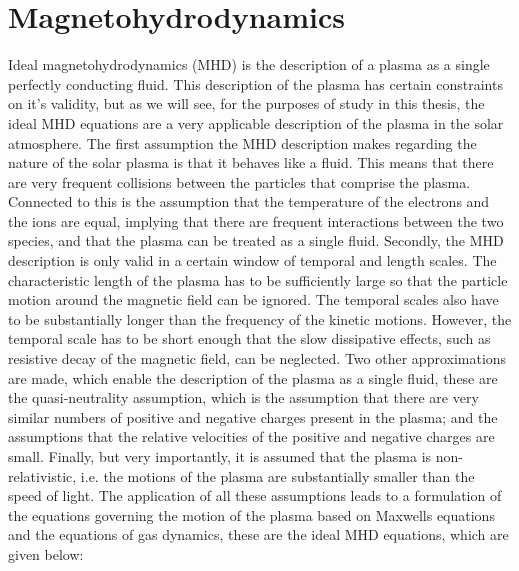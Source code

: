 \section{Magnetohydrodynamics}\label{sec:MHD}

Ideal magnetohydrodynamics (MHD) is the description of a plasma as a single perfectly conducting fluid.
This description of the plasma has certain constraints on it's validity, but as we will see, for the purposes of study in this thesis, the ideal MHD equations are a very applicable description of the plasma in the solar atmosphere.
The first assumption the MHD description makes regarding the nature of the solar plasma is that it behaves like a fluid.
This means that there are very frequent collisions between the particles that comprise the plasma.
Connected to this is the assumption that the temperature of the electrons and the ions are equal, implying that there are frequent interactions between the two species, and that the plasma can be treated as a single fluid.
Secondly, the MHD description is only valid in a certain window of temporal and length scales.
The characteristic length of the plasma has to be sufficiently large so that the particle motion around the magnetic field can be ignored.
The temporal scales also have to be substantially longer than the frequency of the kinetic motions.
However, the temporal scale has to be short enough that the slow dissipative effects, such as resistive decay of the magnetic field, can be neglected.
Two other approximations are made, which enable the description of the plasma as a single fluid, these are the quasi-neutrality assumption, which is the assumption that there are very similar numbers of positive and negative charges present in the plasma; and the assumptions that the relative velocities of the positive and negative charges are small.
Finally, but very importantly, it is assumed that the plasma is non-relativistic, i.e. the motions of the plasma are substantially smaller than the speed of light.
The application of all these assumptions leads to a formulation of the equations governing the motion of the plasma based on Maxwells equations and the equations of gas dynamics, these are the ideal MHD equations, which are given below:
\newcommand{\condev}{\left(\frac{\partial}{\partial t} + \vec{v}\cdot\nabla\right)}

